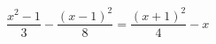 \begin{ex}
	\begin{condition}
		\( \dfrac{x^2-1}{3}-\dfrac{(x-1)^2}{8}=\dfrac{(x+1)^2}{4}-x \)
	\end{condition}
\end{ex}